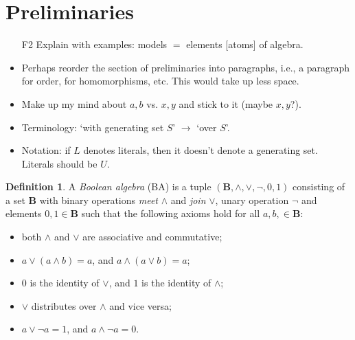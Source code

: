 \documentclass{article}
\theoremstyle{definition}
\newtheorem{definition}{Definition}
\theoremstyle{remark}
\begin{document}
\section{Preliminaries}

\begin{itemize}
\item[F2] Explain with examples: models $=$ elements [atoms] of algebra.
\item Perhaps reorder the section of preliminaries into paragraphs, i.e., a
  paragraph for order, for homomorphisms, etc. This would take up less space.
\item Make up my mind about $a, b$ vs. $x, y$ and stick to it (maybe $x, y$?).
\item Terminology: `with generating set $S$' $\to$ `over $S$'.
\item Notation: if $L$ denotes literals, then it doesn't denote a generating
  set. Literals should be $U$.
\end{itemize}

\begin{definition} \label{def:ba}
  A \emph{Boolean algebra} (BA) is a tuple $(\mathbf{B}, \land, \lor, \neg, 0,
  1)$ consisting of a set $\mathbf{B}$ with binary operations \emph{meet}
  $\land$ and \emph{join} $\lor$, unary operation $\neg$ and elements $0, 1 \in
  \mathbf{B}$ such that the following axioms hold for all $a, b, \in
  \mathbf{B}$:
  \begin{itemize}
  \item both $\land$ and $\lor$ are associative and commutative;
  \item $a \lor (a \land b) = a$, and $a \land (a \lor b) = a$;
  \item $0$ is the identity of $\lor$, and $1$ is the identity of $\land$;
  \item $\lor$ distributes over $\land$ and vice versa;
  \item $a \lor \neg a = 1$, and $a \land \neg a = 0$.
  \end{itemize}
\end{definition}
\end{document}
